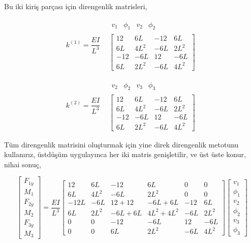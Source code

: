 \documentclass[12pt,fleqn]{article}\usepackage{../../common}
\begin{document}
Bu iki kiriş parçası için direngenlik matrisleri,

$$
k^{(1)} = \frac{EI}{L^3}
\begin{array}{cc} & \begin{array}{rrrr} v_1 & \phi_1 & v_2 & \phi_2 \end{array} \\ &
\left[
\begin{array}{cccc}
  12 & 6L & -12 & 6L \\
  6L & 4L^2 & -6L & 2L^2 \\
  -12 & -6L & 12 & -6L \\
  6L & 2L^2 & -6L & 4L^2
\end{array}
\right]
\end{array} 
$$

$$
k^{(2)} = \frac{EI}{L^3}
\begin{array}{cc} & \begin{array}{rrrr} v_2 & \phi_2 & v_3 & \phi_3 \end{array} \\ &
\left[
\begin{array}{cccc}
  12 & 6L & -12 & 6L \\
  6L & 4L^2 & -6L & 2L^2 \\
  -12 & -6L & 12 & -6L \\
  6L & 2L^2 & -6L & 4L^2
\end{array}
\right]
\end{array} 
$$

Tüm direngenlik matrisini oluşturmak için yine direk direngenlik metotunu
kullanırız, üstdüşüm uygulayınca her iki matris genişletilir, ve üst üste konur,
nihai sonuç,

$$
\left[\begin{array}{c}
F_{1y} \\ M_1 \\ F_{2y} \\ M_2 \\ F_{3y} \\ M_3
\end{array}\right] =
\frac{EI}{L^3}
\left[\begin{array}{cccccc}
12 & 6L & -12 & 6L & 0 & 0 \\
6L & 4L^2 & -6L & 2L^2 & 0 & 0 \\
-12L & -6L & 12+12 & -6L+6L & -12 & 6L \\
6L & 2L^2 & -6L+6L & 4L^2+4L^2 & -6L & 2L^2 \\
0 & 0 & -12 & -6L & 12 & -6L \\
0 & 0 & 6L & 2L^2 & -6L & 4L^2
\end{array}\right]
\left[\begin{array}{c}
v_1 \\ \phi_1 \\ v_2 \\ \phi_2 \\ v_3 \\ \phi_3
\end{array}\right]
$$
\end{document}
